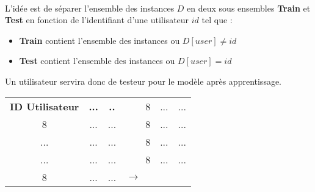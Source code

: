 \paragraph{}L'idée est de séparer l'ensemble des instances $D$ en deux sous ensembles \textbf{Train} et \textbf{Test} en fonction de l'identifiant d'une utilisateur $id$ tel que : 
\begin{itemize}
	\item \textbf{Train} contient l'ensemble des instances ou $D[user]\ne id$
	\item \textbf{Test} contient l'ensemble des instances ou $D[user] = id$
\end{itemize}
\par 
Un utilisateur servira donc de testeur pour le modèle après apprentissage.
\begin{table}[H]
	\centering
	\begin{tabular}{|c|c|c|lllll}
		\cline{1-3} \cline{6-8}
		\textbf{ID Utilisateur}   & \textbf{...}                & \textbf{..}                 &                    & \multicolumn{1}{c|}{} & \multicolumn{1}{c|}{\cellcolor[HTML]{9AFF99}8} & \multicolumn{1}{c|}{\cellcolor[HTML]{9AFF99}...} & \multicolumn{1}{c|}{...} \\ \cline{1-3} \cline{6-8} 
		\cellcolor[HTML]{9AFF99}8 & \cellcolor[HTML]{9AFF99}... & \cellcolor[HTML]{9AFF99}... &                    & \multicolumn{1}{c|}{} & \multicolumn{1}{c|}{\cellcolor[HTML]{9AFF99}8} & \multicolumn{1}{c|}{\cellcolor[HTML]{9AFF99}...} & \multicolumn{1}{c|}{...} \\ \cline{1-3} \cline{6-8} 
		...                       & ...                         & ...                         &                    & \multicolumn{1}{c|}{} & \multicolumn{1}{c|}{\cellcolor[HTML]{9AFF99}8} & \multicolumn{1}{c|}{\cellcolor[HTML]{9AFF99}...} & \multicolumn{1}{c|}{...} \\ \cline{1-3} \cline{6-8} 
		...                       & ...                         & ...                         & \multirow{-4}{*}{} & \multicolumn{1}{c|}{} & \multicolumn{1}{c|}{\cellcolor[HTML]{9AFF99}8} & \multicolumn{1}{c|}{\cellcolor[HTML]{9AFF99}...} & \multicolumn{1}{c|}{...} \\ \cline{1-3} \cline{6-8} 
		\cellcolor[HTML]{9AFF99}8 & \cellcolor[HTML]{9AFF99}... & \cellcolor[HTML]{9AFF99}... & \multicolumn{4}{l}{$\rightarrow$}                                                                                                              &                          \\ \cline{1-3} \cline{6-8} 

\end{tabular}
\end{table}
